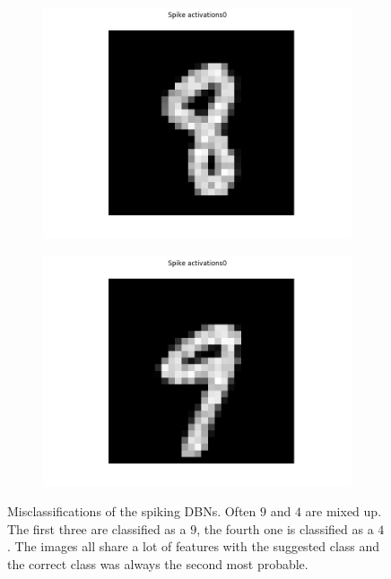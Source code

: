 \begin{figure}[h!]
\begin{subfigure}{.24\textwidth}
  		\includegraphics[width=\linewidth]{imgs/convert/err/err4.png}
  		\label{fig:sub1}
	\end{subfigure}%
	\begin{subfigure}{.24\textwidth}
  		\centering
  		\includegraphics[width=\linewidth]{imgs/convert/err/err3.png}
  		\label{fig:sub1}
	\end{subfigure}%
	
	
	\caption{Misclassifications of the spiking DBNs. Often $9$ and $4$ are mixed up. The first three are classified as a $9$, the fourth one is classified as a $4$. The images all share a lot of features with the suggested class and the correct class was always the second most probable.}
	\label{fig:mismnisthum}
\end{figure}


